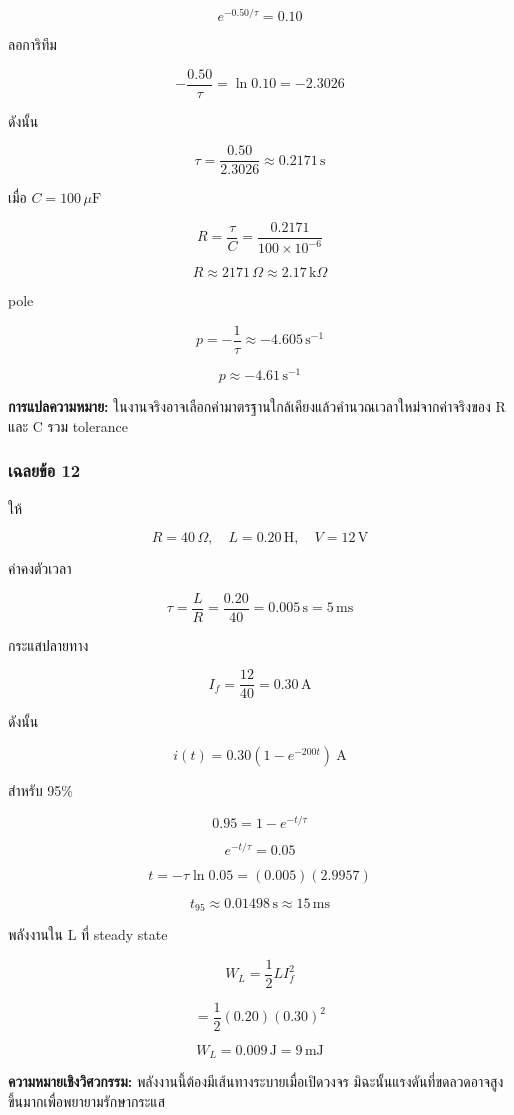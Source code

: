\[
e^{-0.50/\tau}=0.10
\]

ลอการิทึม

\[
-\frac{0.50}{\tau}=\ln0.10=-2.3026
\]

ดังนั้น

\[
\tau=\frac{0.50}{2.3026}\approx0.2171\,\text{s}
\]

เมื่อ $C=100\,\mu\text{F}$

\[
R=\frac{\tau}{C}=\frac{0.2171}{100\times10^{-6}}
\]

\[
\boxed{R\approx2171\,\Omega\approx2.17\,\text{k}\Omega}
\]

pole

\[
p=-\frac{1}{\tau}\approx-4.605\,\text{s}^{-1}
\]

\[
\boxed{p\approx-4.61\,\text{s}^{-1}}
\]

\textbf{การแปลความหมาย:} ในงานจริงอาจเลือกค่ามาตรฐานใกล้เคียงแล้วคำนวณเวลาใหม่จากค่าจริงของ R และ C รวม tolerance

\subsubsection{เฉลยข้อ 12}

ให้

\[
R=40\,\Omega,\quad L=0.20\,\text{H},\quad V=12\,\text{V}
\]

ค่าคงตัวเวลา

\[
\tau=\frac{L}{R}=\frac{0.20}{40}=0.005\,\text{s}=5\,\text{ms}
\]

กระแสปลายทาง

\[
I_f=\frac{12}{40}=0.30\,\text{A}
\]

ดังนั้น

\[
\boxed{i(t)=0.30(1-e^{-200t})\ \text{A}}
\]

สำหรับ 95\%

\[
0.95=1-e^{-t/\tau}
\]

\[
e^{-t/\tau}=0.05
\]

\[
t=-\tau\ln0.05=(0.005)(2.9957)
\]

\[
\boxed{t_{95}\approx0.01498\,\text{s}\approx15\,\text{ms}}
\]

พลังงานใน L ที่ steady state

\[
W_L=\frac{1}{2}LI_f^2
\]

\[
=\frac{1}{2}(0.20)(0.30)^2
\]

\[
\boxed{W_L=0.009\,\text{J}=9\,\text{mJ}}
\]

\textbf{ความหมายเชิงวิศวกรรม:} พลังงานนี้ต้องมีเส้นทางระบายเมื่อเปิดวงจร มิฉะนั้นแรงดันที่ขดลวดอาจสูงขึ้นมากเพื่อพยายามรักษากระแส

